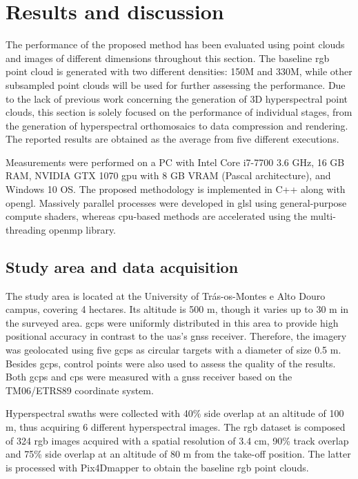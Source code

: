 \section{Results and discussion}

The performance of the proposed method has been evaluated using point clouds and images of different dimensions throughout this section. The baseline \acrshort{rgb} point cloud is generated with two different densities: 150M and 330M, while other subsampled point clouds will be used for further assessing the performance. Due to the lack of previous work concerning the generation of 3D hyperspectral point clouds, this section is solely focused on the performance of individual stages, from the generation of hyperspectral orthomosaics to data compression and rendering. The reported results are obtained as the average from five different executions.

Measurements were performed on a PC with Intel Core i7-7700 3.6 GHz, 16 GB RAM, NVIDIA GTX 1070 \acrshort{gpu} with 8 GB VRAM (Pascal architecture), and Windows 10 OS. The proposed methodology is implemented in C++ along with \acrshort{opengl}. Massively parallel processes were developed in \acrshort{glsl} using general-purpose compute shaders, whereas \acrshort{cpu}-based methods are accelerated using the multi-threading \acrshort{openmp} library.

\subsection{Study area and data acquisition}

The study area is located at the University of Trás-os-Montes e Alto Douro campus, covering 4 hectares. Its altitude is 500 \si{\meter}, though it varies up to 30 \si{\meter} in the surveyed area. \acrshort{gcp}s were uniformly distributed in this area to provide high positional accuracy in contrast to the \acrshort{uas}’s \acrshort{gnss} receiver. Therefore, the imagery was geolocated using five \acrshort{gcp}s as circular targets with a diameter of size 0.5 \si{\meter}. Besides \acrshort{gcp}s, control points were also used to assess the quality of the results. Both \acrshort{gcp}s and \acrshort{cp}s were measured with a \acrshort{gnss} receiver based on the TM06/ETRS89 coordinate system.

Hyperspectral swaths were collected with 40\% side overlap at an altitude of 100 \si{\meter}, thus acquiring 6 different hyperspectral images. The \acrshort{rgb} dataset is composed of 324 \acrshort{rgb} images acquired with a spatial resolution of 3.4 \si{\centi\meter}, 90\% track overlap and 75\% side overlap at an altitude of 80 \si{\meter} from the take-off position. The latter is processed with Pix4Dmapper to obtain the baseline \acrshort{rgb} point clouds. 

